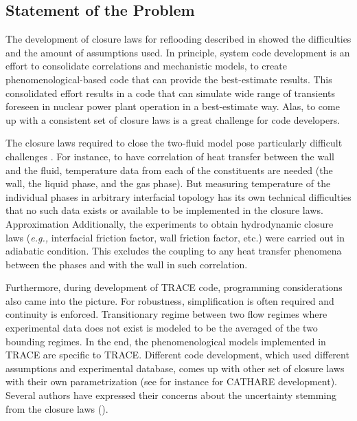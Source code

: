 \documentclass[11pt,titlepage]{article}
\begin{document}
\subsection{Statement of the Problem}

The development of closure laws for reflooding described in \cite{Nelson1992} showed the difficulties and the amount of assumptions used. In principle, system code development is an effort to consolidate correlations and mechanistic models, to create phenomenological-based code that can provide the best-estimate results. This consolidated effort results in a code that can simulate wide range of transients foreseen in nuclear power plant operation in a best-estimate way. Alas, to come up with a consistent set of closure laws is a great challenge for code developers.

The closure laws required to close the two-fluid model pose particularly difficult challenges \cite{Wulff2007}. For instance, to have correlation of heat transfer between the wall and the fluid, temperature data from each of the constituents are needed (the wall, the liquid phase, and the gas phase). But measuring temperature of the individual phases in arbitrary interfacial topology has its own technical difficulties that no such data exists or available to be implemented in the closure laws. Approximation  Additionally, the experiments to obtain hydrodynamic closure laws (\textit{e.g.,} interfacial friction factor, wall friction factor, etc.) were carried out in adiabatic condition. This excludes the coupling to any heat transfer phenomena between the phases and with the wall in such correlation. 

Furthermore, during development of TRACE code, programming considerations also came into the picture. For robustness, simplification is often required and continuity is enforced. Transitionary regime between two flow regimes where experimental data does not exist is modeled to be the averaged of the two bounding regimes. In the end, the phenomenological models implemented in TRACE are specific to TRACE. Different code development, which used different assumptions and experimental database, comes up with other set of closure laws with their own parametrization (see for instance \cite{Bestion1990} for CATHARE development). Several authors have expressed their concerns about the uncertainty stemming from the closure laws (\cite{Wulff2007, DAuria2012, Petruzzi2008}).
\end{document}
